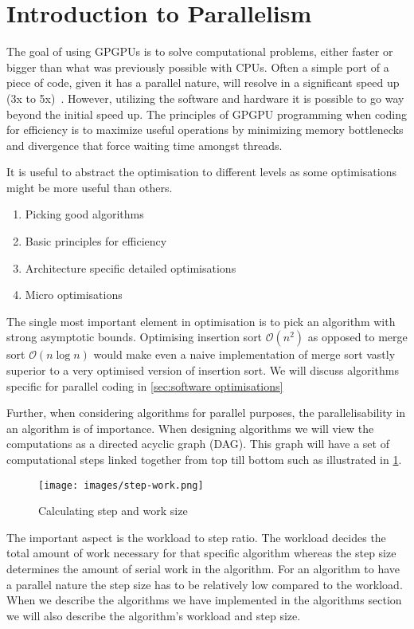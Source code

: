 \section{Introduction to Parallelism}
\label{sec:introduction to parallelism}
The goal of using GPGPUs is to solve computational problems, either faster or bigger than what was previously possible with CPUs.
Often a simple port of a piece of code, given it has a parallel nature, will resolve in a significant speed up (3x to 5x)~\cite{udacity}.
However, utilizing the software and hardware it is possible to go way beyond the initial speed up.
The principles of GPGPU programming when coding for efficiency is to maximize useful operations by minimizing memory bottlenecks and divergence that force waiting time amongst threads.

It is useful to abstract the optimisation to different levels as some optimisations might be more useful than others.

\begin{enumerate}
\item Picking good algorithms
\item Basic principles for efficiency
\item Architecture specific detailed optimisations
\item Micro optimisations
\end{enumerate}

The single most important element in optimisation is to pick an algorithm with strong asymptotic bounds.
Optimising insertion sort $\mathcal{O}(n^2)$ as opposed to merge sort $\mathcal{O}(n\log n)$ would make even a naive implementation of merge sort vastly superior to a very optimised version of insertion sort.
We will discuss algorithms specific for parallel coding in \cref{sec:software optimisations}

Further, when considering algorithms for parallel purposes, the parallelisability in an algorithm is of importance.
When designing algorithms we will view the computations as a directed acyclic graph (DAG).
This graph will have a set of computational steps linked together from top till bottom such as illustrated in \cref{fig:step and work}.

\begin{figure}[htb]
  \centering
  \texttt{[image: images/step-work.png]}
  \caption{Calculating step and work size~\cite{udacity}}
  \label{fig:step and work}
\end{figure}

The important aspect is the workload to step ratio. The workload decides the total amount of work necessary for that specific algorithm whereas the step size determines the amount of serial work in the algorithm.
For an algorithm to have a parallel nature the step size has to be relatively low compared to the workload.
When we describe the algorithms we have implemented in the algorithms section we will also describe the algorithm's workload and step size.

